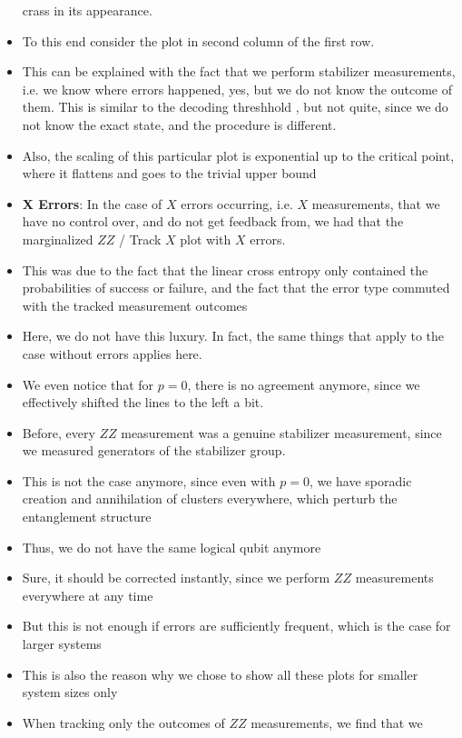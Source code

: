 \begin{itemize}
    crass in its appearance. 
  \item To this end consider the plot in second column of the first row.
  \item This can be explained with the fact that we perform stabilizer
    measurements, i.e. we know where errors happened, yes, but we do not know
    the outcome of them. This is similar to the decoding threshhold
    \cite{roserDecodingProjectiveTransverse2023}, but not quite, since we do
    not know the exact state, and the procedure is different.
  \item Also, the scaling of this particular plot is exponential up to the
    critical point, where it flattens and goes to the trivial upper bound
  \item \textbf{X Errors}: In the case of $X$ errors occurring, i.e. $X$
    measurements, that we have no control over, and do not get feedback from,
    we had that the marginalized $ZZ$ / Track $X$ plot with $X$ errors.
  \item This was due to the fact that the linear cross entropy only contained
    the probabilities of success or failure, and the fact that the error type
    commuted with the tracked measurement outcomes
  \item Here, we do not have this luxury. In fact, the same things that apply
    to the case without errors applies here.
  \item We even notice that for $p=0$, there is no agreement anymore, since we
    effectively shifted the lines to the left a bit.
  \item Before, every $ZZ$ measurement was a genuine stabilizer measurement,
    since we measured generators of the stabilizer group. 
  \item This is not the case anymore, since even with $p=0$, we have sporadic
    creation and annihilation of clusters everywhere, which perturb the
    entanglement structure
  \item Thus, we do not have the same logical qubit anymore
  \item Sure, it should be corrected instantly, since we perform $ZZ$
    measurements everywhere at any time
  \item But this is not enough if errors are sufficiently frequent, which is
    the case for larger systems
  \item This is also the reason why we chose to show all these plots for
    smaller system sizes only
  \item When tracking only the outcomes of $ZZ$ measurements, we find that we

\end{itemize}
